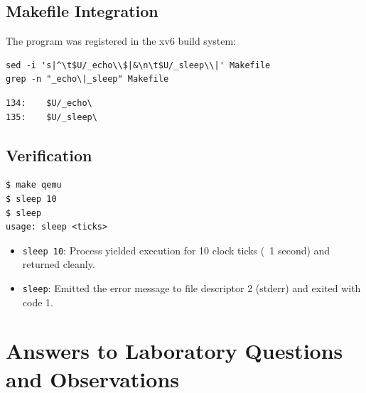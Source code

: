 \documentclass[12pt,a4paper]{article}
\begin{document}
\subsection{Makefile Integration}
The program was registered in the xv6 build system:
\begin{lstlisting}[style=bashstyle]
sed -i 's|^\t$U/_echo\\$|&\n\t$U/_sleep\\|' Makefile
grep -n "_echo\|_sleep" Makefile
\end{lstlisting}
\begin{lstlisting}[style=consolestyle]
134:	$U/_echo\
135:	$U/_sleep\
\end{lstlisting}

\subsection{Verification}
\begin{lstlisting}[style=consolestyle]
$ make qemu
$ sleep 10
$ sleep
usage: sleep <ticks>
\end{lstlisting}
\begin{itemize}
    \item \texttt{sleep 10}: Process yielded execution for 10 clock ticks (~1 second) and returned cleanly.
    \item \texttt{sleep}: Emitted the error message to file descriptor 2 (stderr) and exited with code 1.
\end{itemize}

\section{Answers to Laboratory Questions and Observations}
\end{document}
